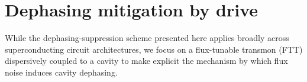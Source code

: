 \section{Dephasing mitigation by drive}  
\label{sec2}

While the dephasing-suppression scheme presented here applies broadly across superconducting circuit architectures, we focus on a flux-tunable transmon (FTT) dispersively coupled to a cavity to make explicit the mechanism by which flux noise induces cavity dephasing.


